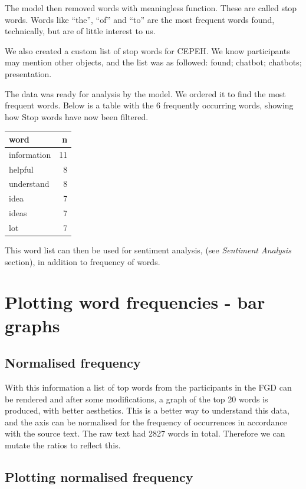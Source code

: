 \documentclass[a4paper, nobind]{templates/ociamthesis}
\begin{document}
The model then removed words with meaningless function. These are called
stop words. Words like ``the'', ``of'' and ``to'' are the most frequent words
found, technically, but are of little interest to us.

We also created a custom list of stop words for CEPEH. We know
participants may mention other objects, and the list was as followed:
found; chatbot; chatbots; presentation.

The data was ready for analysis by the model. We ordered it to find the
most frequent words. Below is a table with the 6 frequently occurring
words, showing how Stop words have now been filtered.

\begin{longtable}[]{@{}lr@{}}
\toprule()
word & n \\
\midrule()
\endhead
information & 11 \\
helpful & 8 \\
understand & 8 \\
idea & 7 \\
ideas & 7 \\
lot & 7 \\
\bottomrule()
\end{longtable}

This word list can then be used for sentiment analysis, (see \emph{Sentiment
Analysis} section), in addition to frequency of words.

\hypertarget{plotting-word-frequencies---bar-graphs}{%
\section{Plotting word frequencies - bar graphs}\label{plotting-word-frequencies---bar-graphs}}

\hypertarget{normalised-frequency}{%
\subsection{Normalised frequency}\label{normalised-frequency}}

With this information a list of top words from the participants in the
FGD can be rendered and after some modifications, a graph of the top 20
words is produced, with better aesthetics. This is a better way to
understand this data, and the axis can be normalised for the frequency
of occurrences in accordance with the source text. The raw text had 2827
words in total. Therefore we can mutate the ratios to reflect this.

\hypertarget{plotting-normalised-frequency}{%
\subsection{Plotting normalised frequency}\label{plotting-normalised-frequency}}
\end{document}
